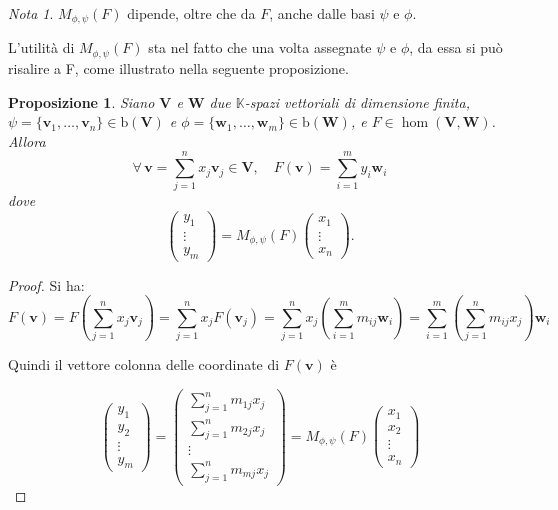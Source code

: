 \documentclass{article}
\theoremstyle{plain}
\newtheorem{prop}[thm]{Proposizione}
\theoremstyle{definition}
\theoremstyle{remark}
\newtheorem{note}{Nota}
\begin{document}
\vspace{10pt}

\begin{note}
    $M_{\phi,\psi}(F)$ dipende, oltre che da $F$, anche dalle basi $\psi$ e $\phi$.
\end{note}

\vspace{10pt}

L'utilità di $M_{\phi,\psi}(F)$ sta nel fatto che una volta assegnate $\psi$ e $\phi$, da essa si può risalire a F, come illustrato nella seguente proposizione.

\vspace{10pt}

\begin{bxthm}
\begin{prop}
Siano $\mathbf{V}$ e $\mathbf{W}$ due $\mathbb{K}$-spazi vettoriali di dimensione finita, 
$\psi = \{\mathbf{v}_1, \ldots, \mathbf{v}_n\}\in\mathrm{b}(\mathbf{V})$ e $\phi = \{\mathbf{w}_1, \ldots, \mathbf{w}_m\}\in\mathrm{b}(\mathbf{W})$, 
e $F\in\hom(\mathbf{V},\mathbf{W})$. Allora
\[
\forall\,\mathbf{v} = \sum_{j=1}^{n}x_j \mathbf{v}_j\in \mathbf{V},\quad F(\mathbf{v}) = \sum_{i=1}^{m}y_i \mathbf{w}_i
\]
dove
\[
\begin{pmatrix}
y_1 \\
\vdots \\
y_m
\end{pmatrix}
=
M_{\phi,\psi}(F)
\begin{pmatrix}
x_1 \\
\vdots \\
x_n
\end{pmatrix}.
\]    
\end{prop}
\end{bxthm}
\begin{proof}
Si ha:
\[F(\mathbf{v})=F\left(\sum_{j=1}^{n}x_j\mathbf{v}_j\right) = \sum_{j=1}^{n}x_jF(\mathbf{v}_j) = \sum_{j=1}^{n}x_j\left(\sum_{i=1}^{m}m_{ij}\mathbf{w}_i\right)=\sum_{i=1}^{m}\left(\sum_{j=1}^{n}m_{ij}x_j\right)\mathbf{w}_i\]

Quindi il vettore colonna delle coordinate di $F(\mathbf{v})$ è

\[
\begin{pmatrix}
y_1 \\
y_2 \\
\vdots \\
y_m
\end{pmatrix}
=
\begin{pmatrix}
\sum\limits_{j=1}^{n} m_{1j} x_j \\
\sum\limits_{j=1}^{n} m_{2j} x_j \\
\vdots \\
\sum\limits_{j=1}^{n} m_{mj} x_j
\end{pmatrix}
=
M_{\phi,\psi}(F)
\begin{pmatrix}
x_1 \\
x_2 \\
\vdots \\
x_n
\end{pmatrix}
\]    
\end{proof}
\end{document}
